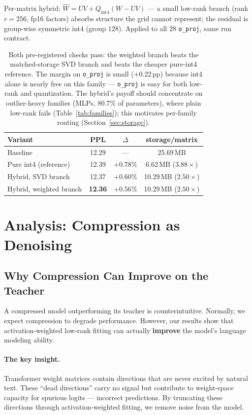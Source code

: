 \documentclass[11pt]{article}
\begin{document}
Per-matrix hybrid: $\hat W = UV + Q_{\mathrm{int4}}(W - UV)$ --- a small
low-rank branch (rank $r=256$, fp16 factors) absorbs structure the grid
cannot represent; the residual is group-wise symmetric int4 (group $128$).
Applied to all 28 \texttt{o\_proj}, same run contract.

\begin{table}[h]
\centering
\begin{tabular}{lccc}
\toprule
Variant & PPL & $\Delta$ & storage/matrix \\
\midrule
Baseline                        & 12.29 & ---            & 25.69\,MB \\
Pure int4 (reference)           & 12.39 & $+0.78\%$      & 6.62\,MB ($3.88\times$) \\
Hybrid, SVD branch              & 12.37 & $+0.60\%$      & 10.29\,MB ($2.50\times$) \\
Hybrid, weighted branch         & \textbf{12.36} & $\mathbf{+0.56\%}$ & 10.29\,MB ($2.50\times$) \\
\bottomrule
\end{tabular}
\caption{Both pre-registered checks pass: the weighted branch beats the
matched-storage SVD branch and beats the cheaper pure-int4 reference. The
margin on \texttt{o\_proj} is small (+0.22\,pp) because int4 alone is
nearly free on this family --- \texttt{o\_proj} is easy for both low-rank
and quantization. The hybrid's payoff should concentrate on outlier-heavy
families (MLPs, 80.7\% of parameters), where plain low-rank fails
(Table~\ref{tab:families}); this motivates per-family routing
(Section~\ref{sec:storage}).}
\label{tab:hybrid}
\end{table}

\section{Analysis: Compression as Denoising}\label{sec:denoise}

\subsection{Why Compression Can Improve on the Teacher}

A compressed model outperforming its teacher is counterintuitive. Normally,
we expect compression to degrade performance. However, our results show that
activation-weighted low-rank fitting can actually \textbf{improve} the
model's language modeling ability.

\paragraph{The key insight.} Transformer weight matrices contain directions
that are never excited by natural text. These ``dead directions'' carry no
signal but contribute to weight-space capacity for spurious logits ---
incorrect predictions. By truncating these directions through
activation-weighted fitting, we remove noise from the model.
\end{document}
